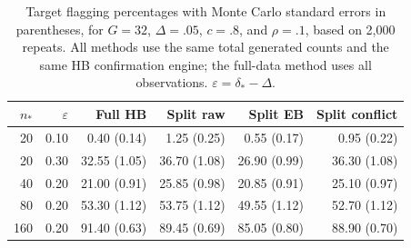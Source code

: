 \begin{table}[t]
\centering\small
\caption{Target flagging percentages with Monte Carlo standard errors in parentheses, for $G=32$, $\Delta=.05$, $c=.8$, and $\rho=.1$, based on 2,000 repeats. All methods use the same total generated counts and the same HB confirmation engine; the full-data method uses all observations. $\varepsilon=\delta_* -\Delta$.}\label{tab:power}
\begin{tabular}{rrrrrr}
\toprule
$n_*$ & $\varepsilon$ & Full HB & Split raw & Split EB & Split conflict \\
\midrule
20 & 0.10 & 0.40 (0.14) & 1.25 (0.25) & 0.55 (0.17) & 0.95 (0.22) \\
20 & 0.30 & 32.55 (1.05) & 36.70 (1.08) & 26.90 (0.99) & 36.30 (1.08) \\
40 & 0.20 & 21.00 (0.91) & 25.85 (0.98) & 20.85 (0.91) & 25.10 (0.97) \\
80 & 0.20 & 53.30 (1.12) & 53.75 (1.12) & 49.55 (1.12) & 52.70 (1.12) \\
160 & 0.20 & 91.40 (0.63) & 89.45 (0.69) & 85.05 (0.80) & 88.90 (0.70) \\
\bottomrule
\end{tabular}
\end{table}
